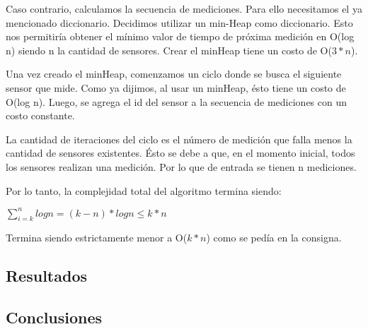 \quad Caso contrario, calculamos la secuencia de mediciones. Para ello necesitamos el ya mencionado diccionario. Decidimos utilizar un min-Heap como diccionario. Esto nos permitir\'ia obtener el m\'inimo valor de tiempo de pr\'oxima medici\'on en O(log n) siendo n la cantidad de sensores. Crear el minHeap tiene un costo de O($ 3*n $).

\quad Una vez creado el minHeap, comenzamos un ciclo donde se busca el siguiente sensor que mide. Como ya dijimos, al usar un minHeap, \'esto tiene un costo de O(log n). Luego, se agrega el id del sensor a la secuencia de mediciones con un costo constante.

\quad La cantidad de iteraciones del ciclo es el n\'umero de medici\'on que falla menos la cantidad de sensores existentes. \'Esto se debe a que, en el momento inicial, todos los sensores realizan una medici\'on. Por lo que de entrada se tienen n mediciones.

\quad Por lo tanto, la complejidad total del algoritmo termina siendo:


$ \displaystyle\sum_{i = k}^{n} log n = (k - n) * log n \leq k * n$

\quad Termina siendo estrictamente menor a O($ k*n $) como se ped\'ia en la consigna.

\subsection{Resultados}



\subsection{Conclusiones}